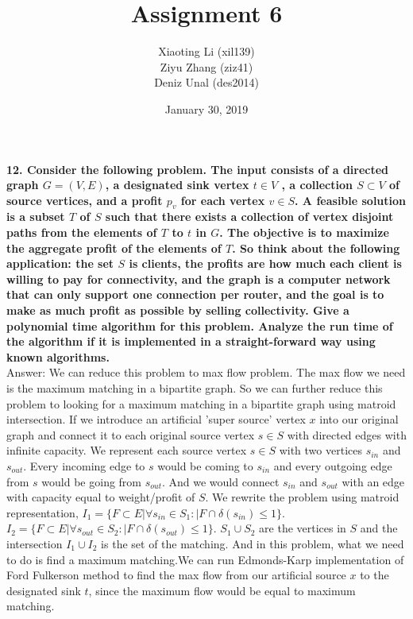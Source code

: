 \documentclass{article}
\title{Assignment 6}
\author{Xiaoting Li (xil139) \\
Ziyu Zhang (ziz41) \\
Deniz Unal (des2014)}
\date{January 30, 2019}
\begin{document}
\maketitle

\noindent
\textbf{12. Consider the following problem. The input consists of a directed graph $G = (V, E)$, a designated sink vertex $t \in V$ , a collection $S \subset V$ of source vertices, and a profit $p_v$ for each vertex $v \in S$. A feasible solution is a subset $T$ of $S$ such that there exists a collection of vertex disjoint paths from the elements of $T$ to $t$ in $G$. The objective is to maximize the aggregate profit of the elements of $T$. So think about the following application: the set $S$ is clients, the profits are how much each client is willing to pay for connectivity, and the graph is a computer network that can only support one connection per router, and the goal is to make as much profit as possible by selling collectivity. Give a polynomial time algorithm for this problem. Analyze the run time of the algorithm if it is implemented in a straight-forward way using known algorithms.} \\ \newline
\noindent
Answer: We can reduce this problem to max flow problem. The max flow we need is the maximum matching in a bipartite graph. So we can further reduce this problem to looking for a maximum matching in a bipartite graph using matroid intersection. If we introduce an artificial 'super source' vertex $x$ into our original graph and connect it to each original source vertex $s \in S$ with  directed edges with infinite capacity. We represent each source vertex $s \in S$ with two vertices $s_{in}$ and $s_{out}$. Every incoming edge to $s$ would be coming to $s_{in}$  and every outgoing edge from $s$ would be going from $s_{out}$. And we would connect $s_{in}$ and $s_{out}$ with an edge with capacity equal to weight/profit of $S$. We rewrite the problem using matroid representation, $I_{1} = \{F\subset E | \forall s_{in} \in S_1: |F \cap \delta(s_{in})\leq 1\}$. $I_{2} = \{F\subset E | \forall s_{out} \in S_2: |F \cap \delta(s_{out})\leq 1\}$. $S_1\cup S_2$ are the vertices in $S$ and the intersection $I_{1}\cup I_{2}$ is the set of the matching. And in this problem, what we need to do is find a maximum matching.We can run Edmonds-Karp implementation of Ford Fulkerson method to find the max flow from our artificial source $x$ to the designated sink $t$, since the maximum flow would be equal to maximum matching. \\ \newline
\end{document}
